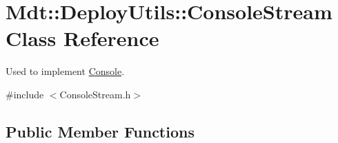 \hypertarget{class_mdt_1_1_deploy_utils_1_1_console_stream}{}\section{Mdt\+:\+:Deploy\+Utils\+:\+:Console\+Stream Class Reference}
\label{class_mdt_1_1_deploy_utils_1_1_console_stream}


Used to implement \hyperlink{class_mdt_1_1_deploy_utils_1_1_console}{Console}.  




{\ttfamily \#include $<$Console\+Stream.\+h$>$}

\subsection*{Public Member Functions}
